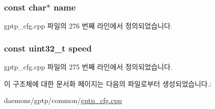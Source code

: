 \subsubsection[{\texorpdfstring{name}{name}}]{\setlength{\rightskip}{0pt plus 5cm}const char$\ast$ name}\hypertarget{structspeed__name__map__t_a8f8f80d37794cde9472343e4487ba3eb}{}\label{structspeed__name__map__t_a8f8f80d37794cde9472343e4487ba3eb}


gptp\+\_\+cfg.\+cpp 파일의 276 번째 라인에서 정의되었습니다.

\subsubsection[{\texorpdfstring{speed}{speed}}]{\setlength{\rightskip}{0pt plus 5cm}const {\bf uint32\+\_\+t} speed}\hypertarget{structspeed__name__map__t_a4bec965cf156a882c43280397a9d3f19}{}\label{structspeed__name__map__t_a4bec965cf156a882c43280397a9d3f19}


gptp\+\_\+cfg.\+cpp 파일의 275 번째 라인에서 정의되었습니다.



이 구조체에 대한 문서화 페이지는 다음의 파일로부터 생성되었습니다.\+:\begin{DoxyCompactItemize}
\item 
daemons/gptp/common/\hyperlink{gptp__cfg_8cpp}{gptp\+\_\+cfg.\+cpp}\end{DoxyCompactItemize}
